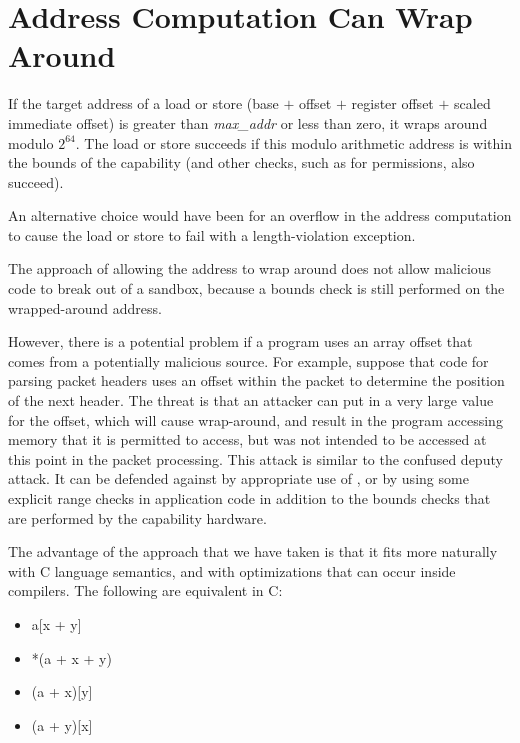 \section{Address Computation Can Wrap Around}

If the target address of a load or store (base $+$ offset $+$ register offset
$+$ scaled immediate offset) is greater than \emph{max\_addr} or less than
zero, it wraps around modulo $2^{64}$. The load or store succeeds if this
modulo arithmetic address is within the bounds of the capability (and other
checks, such as for permissions, also succeed).

An alternative choice would have been for an overflow in the address computation
to cause the load or store to fail with a length-violation exception.

The approach of allowing the address to wrap around does not allow malicious
code to break out of a sandbox, because a bounds check is still performed on
the wrapped-around address.

However, there is a potential problem if a program uses an array offset that
comes from a potentially malicious source. For example, suppose that code for
parsing packet headers uses an offset within the packet to determine the
position of the next header. The threat is that an attacker can put in a
very large value for the offset, which will cause wrap-around, and result
in the program accessing memory that it is permitted to access, but was not
intended to be accessed at this point in the packet processing. This attack
is similar to the confused deputy attack. It can be defended against by
appropriate use of , or by using some explicit
range checks in application code in addition to the bounds checks that are
performed by the capability hardware.

The advantage of the approach that we have taken is that it fits more naturally
with C language semantics, and with optimizations that can occur inside compilers.
The following are equivalent in C:

\begin{itemize}
\item
a[x + y]
\item
*(a + x + y)
\item
(a + x)[y]
\item
(a + y)[x]
\end{itemize}

